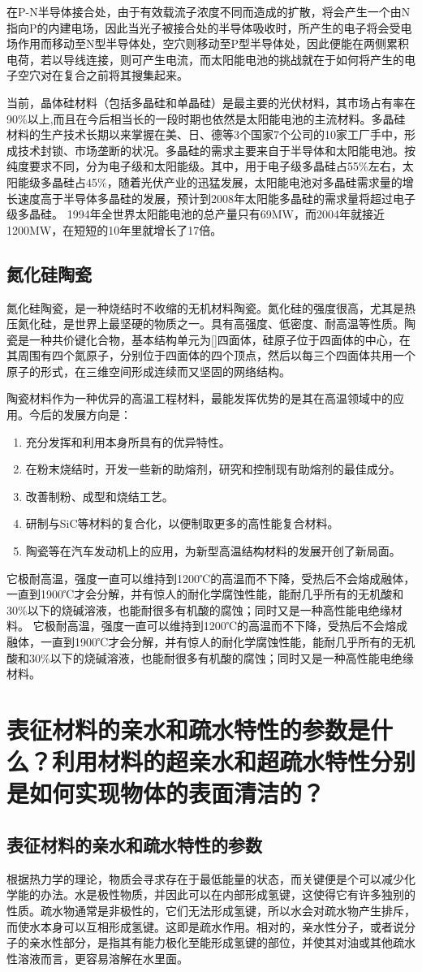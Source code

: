 \documentclass[UTF8,9pt]{ctexart}
\newcommand\se{\section}                                               %
\newcommand\sub{\subsection}                                           %
\newcommand{\rk}[1]{\begin{enumerate}                              %
        #1
    \end{enumerate}}
\begin{document}
在P-N半导体接合处，由于有效载流子浓度不同而造成的扩散，将会产生一个由N指向P的内建电场，因此当光子被接合处的半导体吸收时，所产生的电子将会受电场作用而移动至N型半导体处，空穴则移动至P型半导体处，因此便能在两侧累积电荷，若以导线连接，则可产生电流，而太阳能电池的挑战就在于如何将产生的电子空穴对在复合之前将其搜集起来。

当前，晶体硅材料（包括多晶硅和单晶硅）是最主要的光伏材料，其市场占有率在90\%以上,而且在今后相当长的一段时期也依然是太阳能电池的主流材料。多晶硅材料的生产技术长期以来掌握在美、日、德等3个国家7个公司的10家工厂手中，形成技术封锁、市场垄断的状况。多晶硅的需求主要来自于半导体和太阳能电池。按纯度要求不同，分为电子级和太阳能级。其中，用于电子级多晶硅占55\%左右，太阳能级多晶硅占45\%，随着光伏产业的迅猛发展，太阳能电池对多晶硅需求量的增长速度高于半导体多晶硅的发展，预计到2008年太阳能多晶硅的需求量将超过电子级多晶硅。 1994年全世界太阳能电池的总产量只有69MW，而2004年就接近1200MW，在短短的10年里就增长了17倍。
\sub{氮化硅陶瓷}
氮化硅陶瓷，是一种烧结时不收缩的无机材料陶瓷。氮化硅的强度很高，尤其是热压氮化硅，是世界上最坚硬的物质之一。具有高强度、低密度、耐高温等性质。陶瓷是一种共价键化合物，基本结构单元为[]四面体，硅原子位于四面体的中心，在其周围有四个氮原子，分别位于四面体的四个顶点，然后以每三个四面体共用一个原子的形式，在三维空间形成连续而又坚固的网络结构。

陶瓷材料作为一种优异的高温工程材料，最能发挥优势的是其在高温领域中的应用。今后的发展方向是：
\rk{
    \item 充分发挥和利用\ce{Si3N4}本身所具有的优异特性。
    \item 在\ce{Si3N4}粉末烧结时，开发一些新的助熔剂，研究和控制现有助熔剂的最佳成分。
    \item 改善制粉、成型和烧结工艺。
    \item 研制\ce{Si3N4}与SiC等材料的复合化，以便制取更多的高性能复合材料。
    \item \ce{Si3N4}陶瓷等在汽车发动机上的应用，为新型高温结构材料的发展开创了新局面。
}
    它极耐高温，强度一直可以维持到1200℃的高温而不下降，受热后不会熔成融体，一直到1900℃才会分解，并有惊人的耐化学腐蚀性能，能耐几乎所有的无机酸和30\%以下的烧碱溶液，也能耐很多有机酸的腐蚀；同时又是一种高性能电绝缘材料。
它极耐高温，强度一直可以维持到1200℃的高温而不下降，受热后不会熔成融体，一直到1900℃才会分解，并有惊人的耐化学腐蚀性能，能耐几乎所有的无机酸和30\%以下的烧碱溶液，也能耐很多有机酸的腐蚀；同时又是一种高性能电绝缘材料。
\se{表征材料的亲水和疏水特性的参数是什么？利用材料的超亲水和超疏水特性分别是如何实现物体的表面清洁的？}
\sub{表征材料的亲水和疏水特性的参数}
根据热力学的理论，物质会寻求存在于最低能量的状态，而关键便是个可以减少化学能的办法。水是极性物质，并因此可以在内部形成氢键，这使得它有许多独别的性质。疏水物通常是非极性的，它们无法形成氢键，所以水会对疏水物产生排斥，而使水本身可以互相形成氢键。这即是疏水作用。相对的，亲水性分子，或者说分子的亲水性部分，是指其有能力极化至能形成氢键的部位，并使其对油或其他疏水性溶液而言，更容易溶解在水里面。
\end{document}
